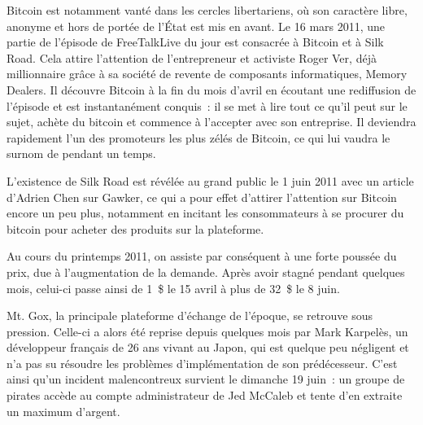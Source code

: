 Bitcoin est notamment vanté dans les cercles libertariens, où son caractère libre, anonyme et hors de portée de l'État est mis en avant. Le 16 mars 2011, une partie de l'épisode de FreeTalkLive du jour est consacrée à Bitcoin et à Silk Road. Cela attire l'attention de l'entrepreneur et activiste Roger Ver, déjà millionnaire grâce à sa société de revente de composants informatiques, Memory Dealers. Il découvre Bitcoin à la fin du mois d'avril en écoutant une rediffusion de l'épisode et est instantanément conquis~: il se met à lire tout ce qu'il peut sur le sujet, achète du bitcoin et commence à l'accepter avec son entreprise. Il deviendra rapidement l'un des promoteurs les plus zélés de Bitcoin, ce qui lui vaudra le surnom de  pendant un temps.

L'existence de Silk Road est révélée au grand public le 1\ier{} juin 2011 avec un article d'Adrien Chen sur Gawker, ce qui a pour effet d'attirer l'attention sur Bitcoin encore un peu plus, notamment en incitant les consommateurs à se procurer du bitcoin pour acheter des produits sur la plateforme. %


Au cours du printemps 2011, on assiste par conséquent à une forte poussée du prix, due à l'augmentation de la demande. Après avoir stagné pendant quelques mois, celui-ci passe ainsi de 1~\$ le 15 avril à plus de 32~\$ le 8 juin.


Mt. Gox, la principale plateforme d'échange de l'époque, se retrouve sous pression. Celle-ci a alors été reprise depuis quelques mois par Mark Karpelès, un développeur français de 26 ans vivant au Japon, qui est quelque peu négligent et n'a pas su résoudre les problèmes d'implémentation de son prédécesseur. C'est ainsi qu'un incident malencontreux survient le dimanche 19 juin~: un groupe de pirates accède au compte administrateur de Jed McCaleb et tente d'en extraite un maximum d'argent.


